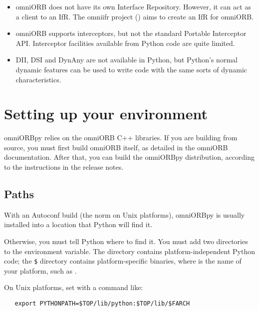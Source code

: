 \documentclass[11pt,oneside,a4paper]{book}
\begin{document}
\begin{itemize}

\item omniORB does not have its own Interface Repository. However, it
  can act as a client to an IfR. The omniifr project
  () aims to create an IfR for
  omniORB.

\item omniORB supports interceptors, but not the standard Portable
  Interceptor API. Interceptor facilities available from Python code
  are quite limited.

\item DII, DSI and DynAny are not available in Python, but Python's
  normal dynamic features can be used to write code with the same
  sorts of dynamic characteristics.

\end{itemize}



\section{Setting up your environment}
\label{sec:setup}

omniORBpy relies on the omniORB C++ libraries. If you are building
from source, you must first build omniORB itself, as detailed in the
omniORB documentation. After that, you can build the omniORBpy
distribution, according to the instructions in the release notes.


\subsection{Paths}

With an Autoconf build (the norm on Unix platforms), omniORBpy is
usually installed into a location that Python will find it.

Otherwise, you must tell Python where to find it. You must add two
directories to the  environment variable. The
 directory contains platform-independent Python code;
the \texttt{\$} directory contains
platform-specific binaries, where  is the name of
your platform, such as .

On Unix platforms, set  with a command like:

\begin{verbatim}
   export PYTHONPATH=$TOP/lib/python:$TOP/lib/$FARCH
\end{verbatim}
\end{document}
